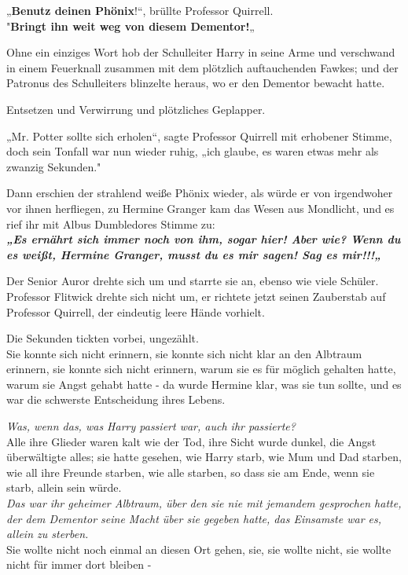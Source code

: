 {„\textbf{Benutz deinen Phönix}!“, brüllte Professor Quirrell.\\ "\textbf{Bringt ihn weit weg von diesem Dementor!}„

Ohne ein einziges Wort hob der Schulleiter Harry in seine Arme und verschwand in einem Feuerknall zusammen mit dem plötzlich auftauchenden Fawkes; und der Patronus des Schulleiters blinzelte heraus, wo er den Dementor bewacht hatte.

Entsetzen und Verwirrung und plötzliches Geplapper.

„Mr. Potter sollte sich erholen“, sagte Professor Quirrell mit erhobener Stimme, doch sein Tonfall war nun wieder ruhig, „ich glaube, es waren etwas mehr als zwanzig Sekunden."

Dann erschien der strahlend weiße Phönix wieder, als würde er von irgendwoher vor ihnen herfliegen, zu Hermine Granger kam das Wesen aus Mondlicht, und es rief ihr mit Albus Dumbledores Stimme zu:\\

\hfill\break \textbf{\emph{„Es ernährt sich immer noch von ihm, sogar hier! Aber wie? Wenn du es weißt, Hermine Granger, musst du es mir sagen! Sag es mir!!!„}}

Der Senior Auror drehte sich um und starrte sie an, ebenso wie viele Schüler.\\ Professor Flitwick drehte sich nicht um, er richtete jetzt seinen Zauberstab auf Professor Quirrell, der eindeutig leere Hände vorhielt.

Die Sekunden tickten vorbei, ungezählt.\\ Sie konnte sich nicht erinnern, sie konnte sich nicht klar an den Albtraum erinnern, sie konnte sich nicht erinnern, warum sie es für möglich gehalten hatte, warum sie Angst gehabt hatte - da wurde Hermine klar, was sie tun sollte, und es war die schwerste Entscheidung ihres Lebens.

\emph{Was, wenn das, was Harry passiert war, auch ihr passierte?}\\ Alle ihre Glieder waren kalt wie der Tod, ihre Sicht wurde dunkel, die Angst überwältigte alles; sie hatte gesehen, wie Harry starb, wie Mum und Dad starben, wie all ihre Freunde starben, wie alle starben, so dass sie am Ende, wenn sie starb, allein sein würde.\\ \emph{Das war ihr geheimer Albtraum, über den sie nie mit jemandem gesprochen hatte, der dem Dementor seine Macht über sie gegeben hatte, das Einsamste war es, allein zu sterben.}\\ Sie wollte nicht noch einmal an diesen Ort gehen, sie, sie wollte nicht, sie wollte nicht für immer dort bleiben -

}
